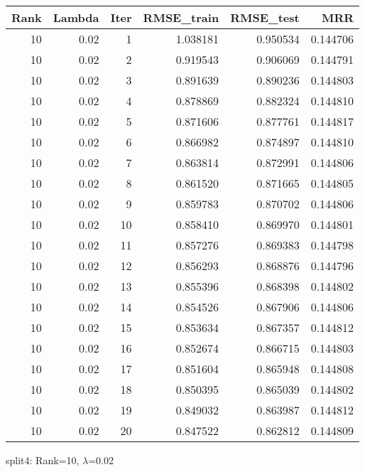 \begin{tabular}{rrrrrr}
\toprule
 Rank &  Lambda &  Iter &  RMSE\_train &  RMSE\_test &       MRR \\
\midrule
   10 &    0.02 &     1 &    1.038181 &   0.950534 &  0.144706 \\
   10 &    0.02 &     2 &    0.919543 &   0.906069 &  0.144791 \\
   10 &    0.02 &     3 &    0.891639 &   0.890236 &  0.144803 \\
   10 &    0.02 &     4 &    0.878869 &   0.882324 &  0.144810 \\
   10 &    0.02 &     5 &    0.871606 &   0.877761 &  0.144817 \\
   10 &    0.02 &     6 &    0.866982 &   0.874897 &  0.144810 \\
   10 &    0.02 &     7 &    0.863814 &   0.872991 &  0.144806 \\
   10 &    0.02 &     8 &    0.861520 &   0.871665 &  0.144805 \\
   10 &    0.02 &     9 &    0.859783 &   0.870702 &  0.144806 \\
   10 &    0.02 &    10 &    0.858410 &   0.869970 &  0.144801 \\
   10 &    0.02 &    11 &    0.857276 &   0.869383 &  0.144798 \\
   10 &    0.02 &    12 &    0.856293 &   0.868876 &  0.144796 \\
   10 &    0.02 &    13 &    0.855396 &   0.868398 &  0.144802 \\
   10 &    0.02 &    14 &    0.854526 &   0.867906 &  0.144806 \\
   10 &    0.02 &    15 &    0.853634 &   0.867357 &  0.144812 \\
   10 &    0.02 &    16 &    0.852674 &   0.866715 &  0.144803 \\
   10 &    0.02 &    17 &    0.851604 &   0.865948 &  0.144808 \\
   10 &    0.02 &    18 &    0.850395 &   0.865039 &  0.144802 \\
   10 &    0.02 &    19 &    0.849032 &   0.863987 &  0.144812 \\
   10 &    0.02 &    20 &    0.847522 &   0.862812 &  0.144809 \\
\bottomrule
\end{tabular}

\caption{split4: Rank=10, $\lambda$=0.02}
